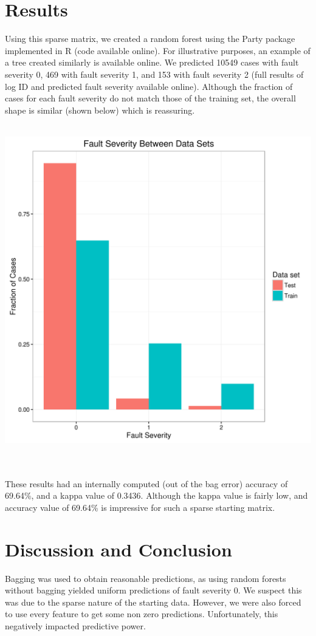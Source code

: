 \documentclass[11pt]{article} %
\begin{document}
\section*{Results}
Using this sparse matrix, we created a random forest using the Party package implemented in R (code available online). For illustrative purposes, an example of a tree created similarly is available online. We predicted 10549 cases with fault severity 0, 469 with fault severity 1, and 153 with fault severity 2 (full results of log ID and predicted fault severity available online). Although the fraction of cases for each fault severity do not match those of the training set, the overall shape is similar (shown below) which is reassuring.\\\\
\begin{centering}\includegraphics[scale=0.6]{Data/p_comp_frac.png}\end{centering}\\\\
These results had an internally computed (out of the bag error) accuracy of 69.64\%, and a kappa value of 0.3436. Although the kappa value is fairly low, and accuracy value of 69.64\% is impressive for such a sparse starting matrix.

\section*{Discussion and Conclusion}
Bagging was used to obtain reasonable predictions, as using random forests without bagging yielded uniform predictions of fault severity 0. We suspect this was due to the sparse nature of the starting data. However, we were also forced to use every feature to get some non zero predictions. Unfortunately, this negatively impacted predictive power.
\end{document}

